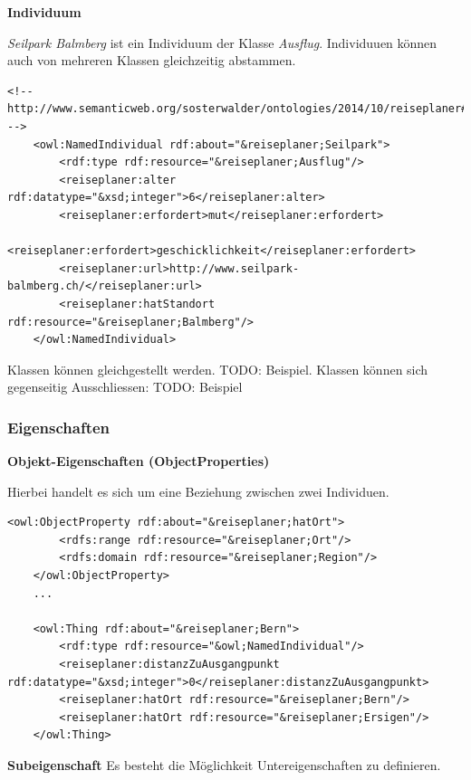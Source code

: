 \textbf{Individuum}

\textit{Seilpark Balmberg} ist ein Individuum der Klasse \textit{Ausflug}. Individuuen können auch von mehreren Klassen gleichzeitig abstammen.

\begin{lstlisting}[caption={Beispiel eines Individuums}]
    <!-- http://www.semanticweb.org/sosterwalder/ontologies/2014/10/reiseplaner#Seilpark -->
    <owl:NamedIndividual rdf:about="&reiseplaner;Seilpark">
        <rdf:type rdf:resource="&reiseplaner;Ausflug"/>
        <reiseplaner:alter rdf:datatype="&xsd;integer">6</reiseplaner:alter>
        <reiseplaner:erfordert>mut</reiseplaner:erfordert>
        <reiseplaner:erfordert>geschicklichkeit</reiseplaner:erfordert>
        <reiseplaner:url>http://www.seilpark-balmberg.ch/</reiseplaner:url>
        <reiseplaner:hatStandort rdf:resource="&reiseplaner;Balmberg"/>
    </owl:NamedIndividual>
\end{lstlisting}

Klassen können gleichgestellt werden. TODO: Beispiel.
Klassen können sich gegenseitig Ausschliessen: TODO: Beispiel

\subsubsection{Eigenschaften}
\label{subsubsec:owlRdf_owl_wissenModellieren_wichtigsteElemente_Propertys}

\textbf{Objekt-Eigenschaften (ObjectProperties)}

Hierbei handelt es sich um eine Beziehung zwischen zwei Individuen.

\begin{lstlisting}[caption={Beispiel einer Objekteigenschaft \textit{hatOrt} und deren Anwendung}]
    <owl:ObjectProperty rdf:about="&reiseplaner;hatOrt">
        <rdfs:range rdf:resource="&reiseplaner;Ort"/>
        <rdfs:domain rdf:resource="&reiseplaner;Region"/>
    </owl:ObjectProperty>
    ...
    
    <owl:Thing rdf:about="&reiseplaner;Bern">
        <rdf:type rdf:resource="&owl;NamedIndividual"/>
        <reiseplaner:distanzZuAusgangpunkt rdf:datatype="&xsd;integer">0</reiseplaner:distanzZuAusgangpunkt>
        <reiseplaner:hatOrt rdf:resource="&reiseplaner;Bern"/>
        <reiseplaner:hatOrt rdf:resource="&reiseplaner;Ersigen"/>
    </owl:Thing>
\end{lstlisting}

\textbf{Subeigenschaft}
Es besteht die Möglichkeit Untereigenschaften zu definieren.

